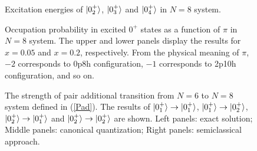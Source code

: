 \documentclass[%
superscriptaddress,
preprint,
showpacs,
nofootinbib,
amsmath,amssymb,
prc,
floatfix ]%
{revtex4-1}
\begin{document}
\begin{figure}[htbp]
 \begin{center}
 \end{center}
 \caption{Excitation energies of $\ket{0_2^+}$, $\ket{0_3^+}$ and $\ket{0_4^+}$ in $N=8$ system.}
 \label{fig:N8energy}
\end{figure}

\begin{figure}[htbp]
 \begin{minipage}{1\hsize}
 \begin{center}
 \end{center}
 \end{minipage}
 \begin{minipage}{1\hsize}
 \begin{center}
 \end{center}
 \end{minipage}
 \caption{Occupation probability in excited $0^+$ states as a function of $\pi$ in $N=8$ system. The upper and lower panels display the results for $x=0.05$ and $x=0.2$, respectively. From the physical meaning of $\pi$, $-2$ corresponds to 0p8h configuration, $-1$ corresponds to 2p10h configuration, and so on.}
 \label{fig:N8_occ}
\end{figure}

\begin{figure}[htbp]
 \begin{minipage}{0.33\hsize}
 \begin{center}
 \end{center}
 \captionsetup{labelformat=empty,labelsep=none}
 \end{minipage}
 \begin{minipage}{0.33\hsize}
 \begin{center}
 \end{center}
 \captionsetup{labelformat=empty,labelsep=none}
 \end{minipage}
 \begin{minipage}{0.33\hsize}
 \begin{center}
 \end{center}
 \captionsetup{labelformat=empty,labelsep=none}
 \end{minipage}
 \caption{The strength of pair additional transition from $N=6$ to $N=8$ system defined in (\ref{Pad}). The results of $\ket{0_1^+}\to\ket{0_1^+}$, $\ket{0_1^+}\to\ket{0_2^+}$, $\ket{0_2^+}\to\ket{0_1^+}$ and $\ket{0_2^+}\to\ket{0_2^+}$ are shown. Left panels: exact solution; Middle panels: canonical quantization; Right panels: semiclassical approach.}
 \label{fig:N8Pad}
\end{figure}
\end{document}
